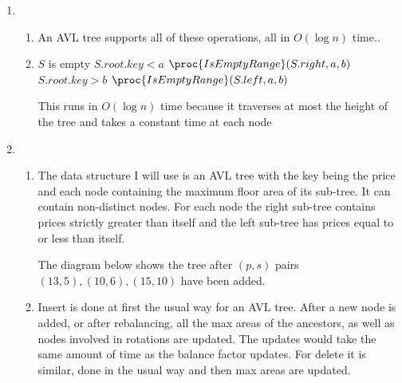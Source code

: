 \documentclass[10pt,a4paper]{article}
\begin{document}
\begin{enumerate}
\begin{enumerate}
\item
$m_0 = 1 > 1.4^0 - 1 = 0$

$m_1 = 2 > 1.4^1 - 1 = 0.4$

$m_2 = 3 > 1.96 - 1$

$m_3 = 5 > 2.744 - 1$

$m_4 = 8 > 3.8416 - 1$

Assume that it is true for some $m_h$ where 
$h > 4$

Then $m_{h+1} = m_h + m_{h-1} - m_{h-5} \geq 1.4^h - 1 + 1.4^{h-1} - 1 - 1.4^{h-5} + 1 = 1.4^{h}(1+ 1.4^{-1} - 1.4^{-5}) - 1 > 1.4^h(1+ 0.7 - 0.18) -1 > 1.4^h(1.4) - 1 = 1.4^{h+1} -1$

\end{enumerate}
\item
\begin{enumerate}
\item An AVL tree supports all of these operations, all in $O(\log n)$ time.. 
\item 
\begin{codebox}
\li \If $S$ is empty
\zi \Then
\li		\Return {}
	\End 
\li \If $S.root.key < a$	
\zi \Then
\li			\Return $\proc{IsEmptyRange}(S.right, a, b)$
	\End
\li \If $S.root.key > b$
\zi	\Then 
\li 		\Return $\proc{IsEmptyRange}(S.left, a, b)$
\End
\li 	\Return {}
	

\end{codebox}

This runs in $O(\log n)$ time because it traverses at most the height of the tree and takes a constant time at each node
\end{enumerate}
\item
\begin{enumerate}
\item The data structure I will use is an AVL tree with the key being the price and each node containing the maximum floor area of its sub-tree. It can contain non-distinct nodes. For each node the right sub-tree contains prices strictly greater than itself and the left sub-tree has prices equal to or less than itself.

The diagram below shows the tree after $(p,s)$ pairs 
$(13, 5), (10, 6), (15, 10)$ have been added.

\item Insert is done at first the usual way for an AVL tree. After a new node is added, or after rebalancing, all the max areas of the ancestors, as well as nodes involved in rotations are updated. The updates would take the same amount of time as the balance factor updates. For delete it is similar, done in the usual way and then max areas are updated.


\end{enumerate}
\end{enumerate}
\end{document}
